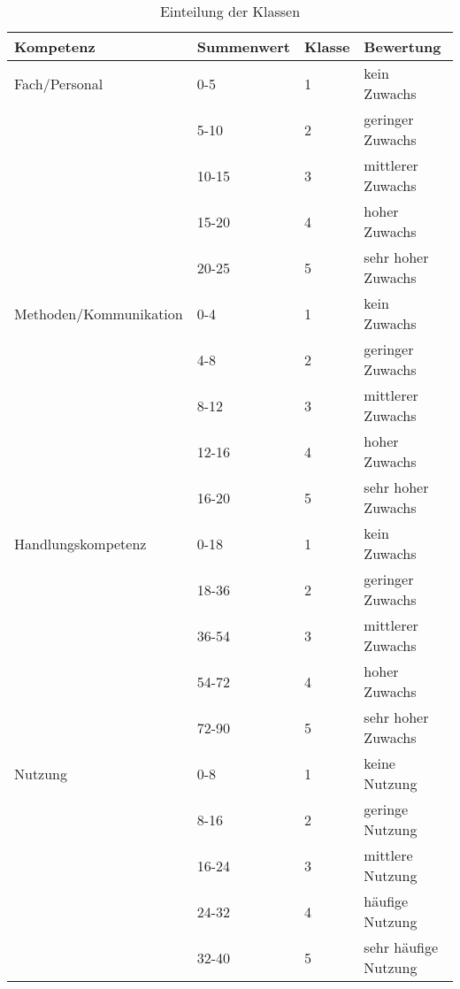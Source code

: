 \begin{table}[]
\centering
\caption{Einteilung der Klassen}
\label{tab:klassen}
\begin{tabular}{@{}llll@{}}
\toprule
Kompetenz              & Summenwert & Klasse & Bewertung          \\ \midrule
Fach/Personal          & 0-5        & 1      & kein Zuwachs       \\
                       & 5-10       & 2      & geringer Zuwachs   \\
                       & 10-15      & 3      & mittlerer Zuwachs  \\
                       & 15-20      & 4      & hoher Zuwachs      \\
                       & 20-25      & 5      & sehr hoher Zuwachs \\ \cmidrule(r){1-4}
Methoden/Kommunikation & 0-4        & 1      & kein Zuwachs       \\
                       & 4-8        & 2      & geringer Zuwachs   \\
                       & 8-12       & 3      & mittlerer Zuwachs  \\
                       & 12-16      & 4      & hoher Zuwachs      \\
                       & 16-20      & 5      & sehr hoher Zuwachs \\ 
                       \cmidrule(r){1-4}
Handlungskompetenz 	& 0-18       & 1      & kein Zuwachs       \\
                       & 18-36        & 2      & geringer Zuwachs   \\
                       & 36-54       & 3      & mittlerer Zuwachs  \\
                       & 54-72      & 4      & hoher Zuwachs      \\
                       & 72-90      & 5      & sehr hoher Zuwachs \\ 
                       \cmidrule(r){1-4}
Nutzung	& 0-8       & 1      & keine Nutzung       \\
                       & 8-16        & 2      & geringe Nutzung   \\
                       & 16-24       & 3      & mittlere Nutzung  \\
                       & 24-32     & 4      & häufige Nutzung      \\
                       & 32-40      & 5      & sehr häufige Nutzung \\ 
                       \bottomrule
\end{tabular}
\end{table}

